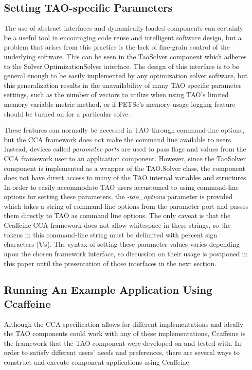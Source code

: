 \documentclass[doublespacing,12pt]{article}
\begin{document}
\subsection{Setting TAO-specific Parameters}
The use of abstract interfaces and dynamically loaded components can
certainly be a useful tool in encouraging code reuse and intelligent
software design, but a problem that arises from this practice is the
lack of fine-grain control of the underlying software.  This can be
seen in the \textsf{TaoSolver} component which adheres to
the \textsf{Sol\-ver.Op\-ti\-mi\-za\-tion\-Sol\-ver} interface.  The design of this interface
is to be general enough to be easily implemented by any optimization
solver software, but this generalization results in the unavailability
of many TAO specific parameter settings, such as the number of vectors
to utilize when using TAO's limited memory variable metric method, or
if PETSc's memory-usage logging feature should be turned on for a
particular solve.  

These features can normally be accessed in TAO through command-line
options, but the CCA framework does not make the command line
available to users.  Instead, devices called \textit{parameter ports}
are used to pass flags and values from the CCA framework user to an
application component.  However, since the \textsf{TaoSolver} component is
implemented as a wrapper of the \textsf{TAO.Solver} class, the component does
not have direct access to many of the TAO internal variables and
structures.  In order to easily accommodate TAO users accustomed to using
command-line options for setting these parameters, the
\textit{-tao\_options} parameter is provided which takes a string of
command-line options from the parameter port and passes them directly
to TAO as command line options.  The only caveat is that the Ccaffeine
CCA framework does not allow whitespace in these strings, so the
tokens in this command-line string must be delimited with percent
sign characters (\texttt{\%}'s).
The syntax of setting these parameter values varies depending upon
the chosen framework interface, so discussion on their usage is
postponed in this paper until the presentation of those interfaces in
the next section.

\subsection{Running An Example Application Using Ccaffeine}
Although the CCA specification allows for different implementations
and ideally the TAO components could work with any of these implementations,
Ccaffeine is the framework that the TAO component were developed on
and tested with.  In order to satisfy different users' needs and
preferences, there are several ways to construct and execute component
applications using Ccaffeine.
\end{document}
